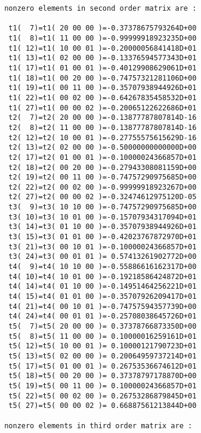 {\begin{verbatim}
 nonzero elements in second order matrix are :

  t1(  7)=t1( 20 00 00 )=-0.37378675793264D+00
  t1(  8)=t1( 11 00 00 )=-0.99999918923235D+00
  t1( 12)=t1( 10 00 01 )=-0.20000056841418D+01
  t1( 13)=t1( 02 00 00 )=-0.13376594577343D+01
  t1( 17)=t1( 01 00 01 )=-0.40129908629061D+01
  t1( 18)=t1( 00 20 00 )=-0.74757321281106D+00
  t1( 19)=t1( 00 11 00 )=-0.35707938944926D+01
  t1( 22)=t1( 00 02 00 )=-0.64267835458532D+01
  t1( 27)=t1( 00 00 02 )=-0.20065122622686D+01
  t2(  7)=t2( 20 00 00 )=-0.13877787807814D-16
  t2(  8)=t2( 11 00 00 )=-0.13877787807814D-16
  t2( 12)=t2( 10 00 01 )=-0.27755575615629D-16
  t2( 13)=t2( 02 00 00 )=-0.50000000000000D+00
  t2( 17)=t2( 01 00 01 )=-0.10000024366857D+01
  t2( 18)=t2( 00 20 00 )=-0.27943308081159D+00
  t2( 19)=t2( 00 11 00 )=-0.74757290975685D+00
  t2( 22)=t2( 00 02 00 )=-0.99999918923267D+00
  t2( 27)=t2( 00 00 02 )=-0.32474612975120D-05
  t3(  9)=t3( 10 10 00 )=-0.74757290975685D+00
  t3( 10)=t3( 10 01 00 )=-0.15707934317094D+01
  t3( 14)=t3( 01 10 00 )=-0.35707938944926D+01
  t3( 15)=t3( 01 01 00 )=-0.42023767872970D+01
  t3( 21)=t3( 00 10 01 )=-0.10000024366857D+01
  t3( 24)=t3( 00 01 01 )= 0.57413261902772D+00
  t4(  9)=t4( 10 10 00 )=-0.55886616162317D+00
  t4( 10)=t4( 10 01 00 )=-0.19218586424872D+01
  t4( 14)=t4( 01 10 00 )=-0.14951464256221D+01
  t4( 15)=t4( 01 01 00 )=-0.35707926209417D+01
  t4( 21)=t4( 00 10 01 )=-0.74757594357739D+00
  t4( 24)=t4( 00 01 01 )=-0.25708038645726D+01
  t5(  7)=t5( 20 00 00 )= 0.37378766873350D+00
  t5(  8)=t5( 11 00 00 )= 0.10000016259161D+01
  t5( 12)=t5( 10 00 01 )= 0.10000121790723D+01
  t5( 13)=t5( 02 00 00 )= 0.20064959737214D+01
  t5( 17)=t5( 01 00 01 )= 0.26753536674612D+01
  t5( 18)=t5( 00 20 00 )= 0.37378797178870D+00
  t5( 19)=t5( 00 11 00 )= 0.10000024366857D+01
  t5( 22)=t5( 00 02 00 )= 0.26753286879845D+01
  t5( 27)=t5( 00 00 02 )= 0.66887561213844D+00

 nonzero elements in third order matrix are :


\end{verbatim}}
